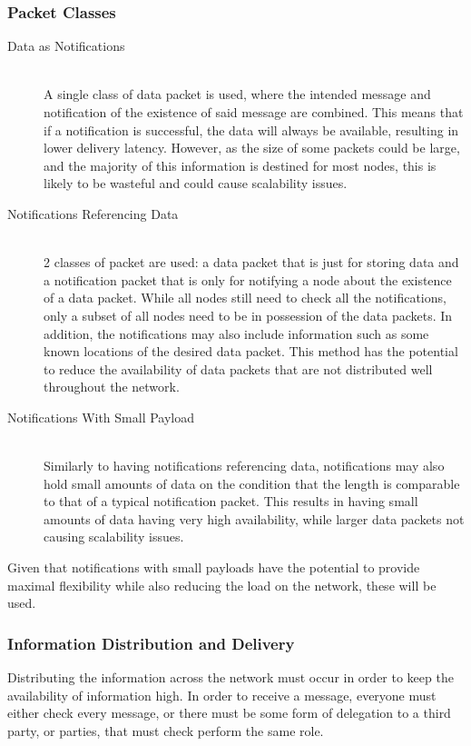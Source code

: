 		\subsubsection{Packet Classes}
			\begin{description}
				\item[Data as Notifications] \hfill \\
				A single class of data packet is used, where the intended message and notification of the existence of said message are combined. This means that if a notification is successful, the data will always be available, resulting in lower delivery latency. However, as the size of some packets could be large, and the majority of this information is destined for most nodes, this is likely to be wasteful and could cause scalability issues.
				\item[Notifications Referencing Data] \hfill \\
				2 classes of packet are used: a data packet that is just for storing data and a notification packet that is only for notifying a node about the existence of a data packet. While all nodes still need to check all the notifications, only a subset of all nodes need to be in possession of the data packets. In addition, the notifications may also include information such as some known locations of the desired data packet. This method has the potential to reduce the availability of data packets that are not distributed well throughout the network.
				\item[Notifications With Small Payload] \hfill \\
				Similarly to having notifications referencing data, notifications may also hold small amounts of data on the condition that the length is comparable to that of a typical notification packet. This results in having small amounts of data having very high availability, while larger data packets not causing scalability issues.
			\end{description}
			
			
			Given that notifications with small payloads have the potential to provide maximal flexibility while also reducing the load on the network, these will be used.
			
		\subsubsection{Information Distribution and Delivery}
			Distributing the information across the network must occur in order to keep the availability of information high. In order to receive a message, everyone must either check every message, or there must be some form of delegation to a third party, or parties, that must check perform the same role.
			
